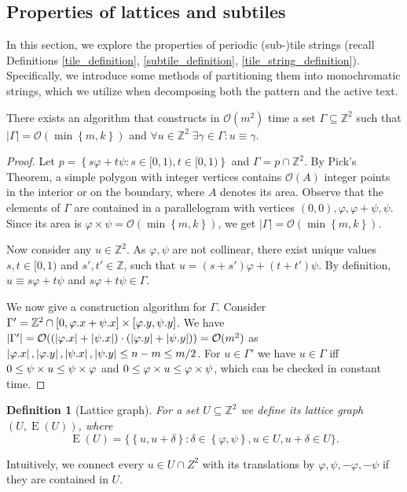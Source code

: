 \documentclass[twoside,leqno]{article}
\newtheorem{definition}{Definition}[section]
\newcommand{\Z}{\mathbb{Z}}
\renewcommand{\O}{\mathcal{O}}
\renewcommand{\phi}{\varphi}
\newcommand{\set}[1]{\left\lbrace #1 \right\rbrace}
\newcommand{\bigset}[1]{\big \lbrace #1 \big \rbrace}
\DeclareMathOperator*{\Edges}{E}
\newcommand{\absolute}[1]{\left\lvert#1\right\rvert}
\begin{document}
\subsection{Properties of lattices and subtiles} \label{sec:lattices_subtiles}
In this section, we explore the properties of periodic (sub-)tile strings (recall Definitions \ref{tile_definition}, \ref{subtile_definition}, \ref{tile_string_definition}).
Specifically, we introduce some methods of partitioning them into monochromatic strings, which we utilize when decomposing both the pattern and the active text.

\begin{lemma} \label{lattice_base}
	There exists an algorithm that constructs in $\O(m^2)$ time a set $\Gamma \subseteq \Z^2$ such that $\absolute{\Gamma} = \O(\min\set{m, k})$ and $\forall u \in \Z^2 \; \exists \gamma \in \Gamma : u \equiv \gamma$.
\end{lemma} 
	\begin{proof}
		Let $p = \set{s\phi + t\psi : s \in [0, 1), t \in [0, 1)}$ and $\Gamma = p \cap \Z^2$.
		By Pick's Theorem, a simple polygon with integer vertices contains $\O(A)$ integer points in the interior or on the boundary, where $A$ denotes its area.
		Observe that the elements of $\Gamma$ are contained in a parallelogram with vertices $(0, 0), \phi, \phi + \psi, \psi$.
		Since its area is $\phi \times \psi = \O(\min\set{m, k})$, we get $\absolute{\Gamma} = \O(\min\set{m, k})$.
		
		Now consider any $u \in \Z^2$.
		As $\phi, \psi$ are not collinear, there exist unique values $s, t \in [0, 1)$ and $s', t' \in \Z$, such that
		$u = (s + s') \phi + (t + t') \psi$.
		By definition, 
		$u \equiv s\phi + t\psi$ and $s\phi + t\psi \in \Gamma$.
		
		We now give a construction algorithm for $\Gamma$. Consider $\Gamma' = \Z^2 \cap [0,\x{\phi}+\x{\psi}] \times [\y{\phi},\y{\psi}]$. We have $\absolute{\Gamma'} = \O((\absolute{\x{\phi}}+\absolute{\x{\psi}}) \cdot (\absolute{\y{\phi}}+\absolute{\y{\psi}})) = \O(m^2)$ as $\absolute{\x{\phi}}, \absolute{\y{\phi}}, \absolute{\x{\psi}}, \absolute{\y{\psi}} \le n - m \le m / 2$. For $u \in \Gamma'$ we have $u \in \Gamma$ iff $0 \le \s{u} \le \s{\phi}$ and $0 \le \h{u} \le \h{\psi}$, which can be checked in constant time. 
	\end{proof}

\begin{definition}[Lattice graph]
	For a set $U \subseteq \Z^2$ we define its \emph{lattice graph} $(U, \Edges(U))$, where
$$\Edges(U) = \bigset{\set{u, u + \delta} : \delta \in \set{\phi, \psi}, u \in U, u + \delta \in U}.$$
\end{definition}
Intuitively, we connect every $u \in U \cap Z^2$ with its translations by $\phi, \psi, -\phi, -\psi$ if they are contained in $U$.
\end{document}
